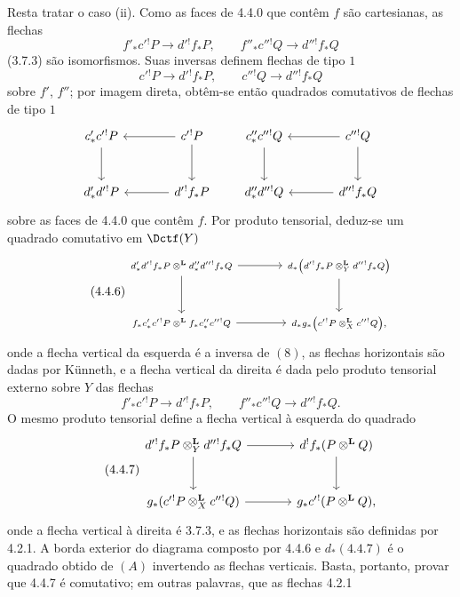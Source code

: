 \begin{prooftext}[Demonstração]
Resta tratar o caso (ii). Como as faces de 4.4.0 que contêm $f$ são cartesianas, as flechas
\[
f'_*c'{}^!P\longrightarrow d'{}^!f_*P,\qquad
f''_*c''{}^!Q\longrightarrow d''{}^!f_*Q
\]
(3.7.3) são isomorfismos. Suas inversas definem flechas de tipo $1$
\[
c'{}^!P\longrightarrow d'{}^!f_*P,\qquad
c''{}^!Q\longrightarrow d''{}^!f_*Q
\]
sobre $f'$, $f''$; por imagem direta, obtêm-se então quadrados comutativos de flechas de tipo $1$
\[
\begin{tikzcd}[column sep=large,row sep=large]
c'_*c'{}^!P \arrow[d] & c'{}^!P\arrow[l]\arrow[d]\\
d'_*d'{}^!P & d'{}^!f_*P\arrow[l]
\end{tikzcd}
\qquad
\begin{tikzcd}[column sep=large,row sep=large]
c''_*c''{}^!Q \arrow[d] & c''{}^!Q\arrow[l]\arrow[d]\\
d''_*d''{}^!Q & d''{}^!f_*Q\arrow[l]
\end{tikzcd}
\]
sobre as faces de 4.4.0 que contêm $f$. Por produto tensorial, deduz-se um quadrado comutativo em $\Dctf(Y)$
\begin{equation}
\tag{4.4.6}
\begin{tikzcd}[column sep=large,row sep=large,cells={nodes={font=\scriptsize}}]
d'_*d'{}^!f_*P\otimes^{\mathbf L}d''_*d''{}^!f_*Q
 \arrow[r]\arrow[d] &
d_*\bigl(d'{}^!f_*P\otimes_Y^{\mathbf L}d''{}^!f_*Q\bigr)\arrow[d]\\
f_*c'_*c'{}^!P\otimes^{\mathbf L}f_*c''_*c''{}^!Q
 \arrow[r] &
d_*g_*\bigl(c'{}^!P\otimes_X^{\mathbf L}c''{}^!Q\bigr),
\end{tikzcd}
\end{equation}
onde a flecha vertical da esquerda é a inversa de $(8)$, as flechas horizontais são dadas por Künneth, e a flecha vertical da direita é dada pelo produto tensorial externo sobre $Y$ das flechas
\[
f'_*c'{}^!P\longrightarrow d'{}^!f_*P,\qquad
f''_*c''{}^!Q\longrightarrow d''{}^!f_*Q.
\]
O mesmo produto tensorial define a flecha vertical à esquerda do quadrado
\begin{equation}
\tag{4.4.7}
\begin{tikzcd}[column sep=large,row sep=large]
d'{}^!f_*P\otimes_Y^{\mathbf L}d''{}^!f_*Q
 \arrow[r]\arrow[d] &
d^!f_*(P\otimes^{\mathbf L}Q)\arrow[d]\\
g_*(c'{}^!P\otimes_X^{\mathbf L}c''{}^!Q)
 \arrow[r] &
g_*c'{}^!(P\otimes^{\mathbf L}Q),
\end{tikzcd}
\end{equation}
onde a flecha vertical à direita é 3.7.3, e as flechas horizontais são definidas por 4.2.1. A borda exterior do diagrama composto por 4.4.6 e $d_*(4.4.7)$ é o quadrado obtido de $(A)$ invertendo as flechas verticais. Basta, portanto, provar que 4.4.7 é comutativo; em outras palavras, que as flechas 4.2.1

\end{prooftext}
